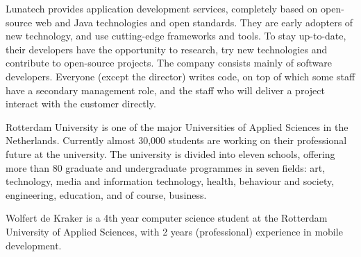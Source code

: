 Lunatech provides application development services, completely based on open-source web and Java technologies and open standards. They are early adopters of new technology, and use cutting-edge frameworks and tools. To stay up-to-date, their developers have the opportunity to research, try new technologies and contribute to open-source projects. The company consists mainly of software developers. Everyone (except the director) writes code, on top of which some staff have a secondary management role, and the staff who will deliver a project interact with the customer directly.

Rotterdam University is one of the major Universities of Applied Sciences in the Netherlands. Currently almost 30,000 students are working on their professional future at the university.
The university is divided into eleven schools, offering more than 80 graduate and undergraduate programmes in seven fields: art, technology, media and information technology, health, behaviour and society, engineering, education, and of course, business.\cite{HogeschoolRotterdam2012}

Wolfert de Kraker is a 4th year computer science student at the Rotterdam University of Applied Sciences, with 2 years (professional) experience in mobile development.
